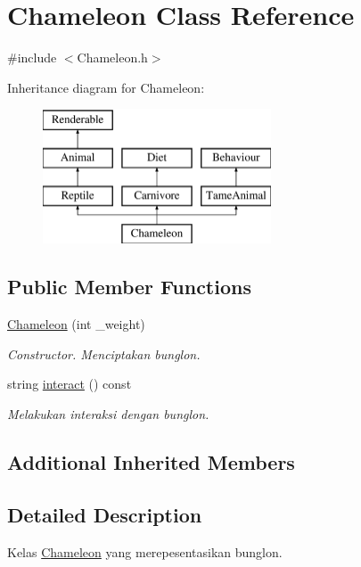 \hypertarget{classChameleon}{\section{Chameleon Class Reference}
\label{classChameleon}
}


{\ttfamily \#include $<$Chameleon.\+h$>$}

Inheritance diagram for Chameleon\+:\begin{figure}[H]
\begin{center}
\leavevmode
\includegraphics[height=4.000000cm]{classChameleon}
\end{center}
\end{figure}
\subsection*{Public Member Functions}
\begin{DoxyCompactItemize}
\item 
\hypertarget{classChameleon_a964d02d53c3f97e72b4331a443b9a8ab}{\hyperlink{classChameleon_a964d02d53c3f97e72b4331a443b9a8ab}{Chameleon} (int \+\_\+weight)}\label{classChameleon_a964d02d53c3f97e72b4331a443b9a8ab}

\begin{DoxyCompactList}\small\item\em Constructor. Menciptakan bunglon. \end{DoxyCompactList}\item 
string \hyperlink{classChameleon_af2d7cd98b862a6c93a757a43c701f74f}{interact} () const 
\begin{DoxyCompactList}\small\item\em Melakukan interaksi dengan bunglon. \end{DoxyCompactList}\end{DoxyCompactItemize}
\subsection*{Additional Inherited Members}


\subsection{Detailed Description}
Kelas \hyperlink{classChameleon}{Chameleon} yang merepesentasikan bunglon. 

